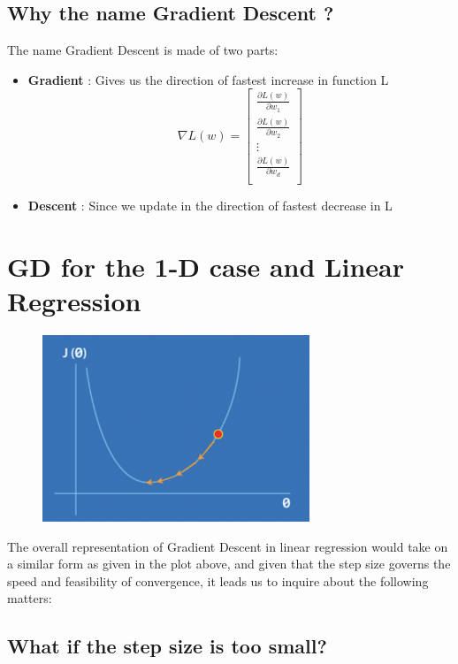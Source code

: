 \documentclass{report}
\begin{document}
\subsection{Why the name Gradient Descent ?}
The name Gradient Descent is made of two parts:
\begin{itemize}
  \item \textbf{Gradient} :  Gives us the direction of fastest increase in function L
        \begin{equation*}
          \nabla L(w) =
          \begin{bmatrix}
            \frac{\partial L(w)}{\partial w_{1}} \\
            \frac{\partial L(w)}{\partial w_{2}} \\
            \vdots                               \\
            \frac{\partial L(w)}{\partial w_{d}} \\
          \end{bmatrix}
        \end{equation*}
  \item \textbf{Descent} : Since we update in the direction of fastest decrease in L
\end{itemize}
\section{GD for the 1-D case and Linear Regression}
\begin{figure}[h]
  \includegraphics[width=8cm]{images/10.png}
  \centering
\end{figure}

The overall representation of Gradient Descent in linear regression would take on a similar form as given in the plot above, and given that the step size governs the speed and feasibility of convergence, it leads us to inquire about the following matters:

\subsection{What if the step size is too small?}
\end{document}
